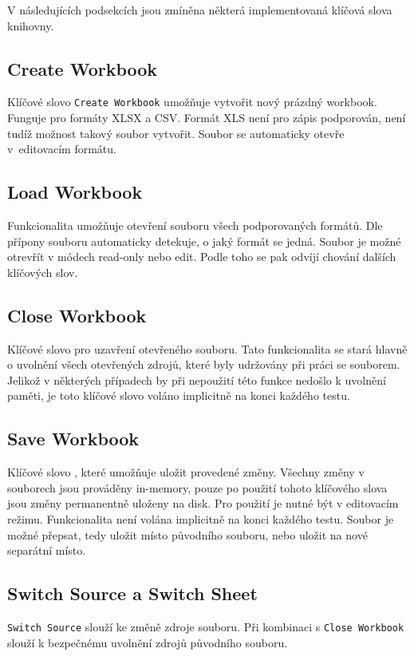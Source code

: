 V následujících podsekcích jsou zmíněna některá implementovaná klíčová slova knihovny.

\subsection{Create Workbook}
Klíčové slovo \texttt{Create Workbook} umožňuje vytvořit nový prázdný workbook. Funguje pro formáty XLSX a CSV. Formát XLS není pro zápis podporován, není tudíž možnost takový soubor vytvořit. Soubor se automaticky otevře v~editovacím formátu.

\subsection{Load Workbook}
Funkcionalita umožňuje otevření souboru všech podporovaných formátů. Dle přípony souboru automaticky detekuje, o jaký formát se jedná. Soubor je možné otrevřít v módech read-only nebo edit. Podle toho se pak odvíjí chování dalších klíčových slov.

\subsection{Close Workbook}
Klíčové slovo pro uzavření otevřeného souboru. Tato funkcionalita se stará hlavně o uvolnění všech otevřených zdrojů, které byly udržovány při práci se souborem. Jelikož v některých případech by při nepoužití této funkce nedošlo k uvolnění paměti, je toto klíčové slovo voláno implicitně na konci každého testu.

\subsection{Save Workbook}
Klíčové slovo , které umožňuje uložit provedené změny. Všechny změny v souborech jsou prováděny in-memory, pouze po použití tohoto klíčového slova jsou změny permanentně uloženy na disk. Pro použití je nutné být v editovacím režimu. Funkcionalita není volána implicitně na konci každého testu. Soubor je možné přepsat, tedy uložit místo původního souboru, nebo uložit na nové separátní místo.

\subsection{Switch Source a Switch Sheet}
\texttt{Switch Source} slouží ke změně zdroje souboru. Při kombinaci s \texttt{Close Workbook} slouží k bezpečnému uvolnění zdrojů původního souboru.


